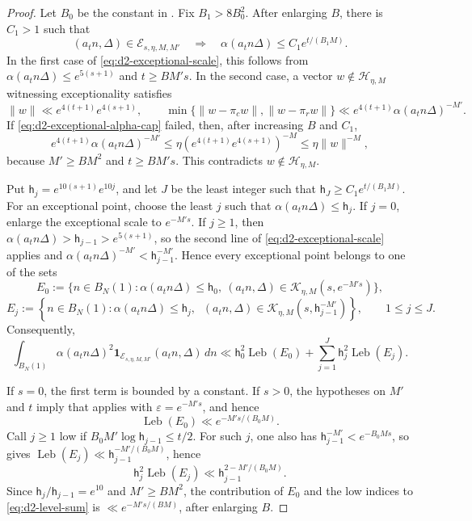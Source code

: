 \documentclass[reqno,11pt]{amsart}
\theoremstyle{definition}
\theoremstyle{remark}
\numberwithin{equation}{section}
\newcommand{\Leb}{\operatorname{Leb}}
\begin{document}
\begin{proof}
Let $B_0$ be the constant in . Fix $B_1>8B_0^2$. After enlarging $B$, there is $C_1>1$ such that
\begin{equation}\label{eq:d2-exceptional-alpha-cap}
(a_tn,\Delta)\in\mathcal E_{s,\eta,M,M'}\quad\Rightarrow\quad 
\alpha(a_tn\Delta)\le C_1e^{t/(B_1M)}.
\end{equation}
In the first case of \eqref{eq:d2-exceptional-scale}, this follows from $\alpha(a_tn\Delta)\le e^{5(s+1)}$ and $t\ge BM's$. In the second case, a vector $w\notin\mathcal H_{\eta,M}$ witnessing exceptionality satisfies
$$
\|w\|\ll e^{4(t+1)} e^{4(s+1)},
\qquad
\min\{\|w-\pi_cw\|,\|w-\pi_rw\|\}\ll e^{4(t+1)}\alpha(a_tn\Delta)^{-M'}.
$$
If \eqref{eq:d2-exceptional-alpha-cap} failed, then, after increasing $B$ and $C_1$,
$$
 e^{4(t+1)} \alpha(a_tn\Delta)^{-M'}\le\eta(e^{4(t+1)} e^{4(s+1)})^{-M}\le\eta\|w\|^{-M},
$$
because $M'\ge BM^2$ and $t\ge BM's$. This contradicts $w\notin\mathcal H_{\eta,M}$.

Put $\mathsf h_j=e^{10(s+1)}e^{10j}$, and let $J$ be the least integer such that $\mathsf h_J\ge C_1e^{t/(B_1M)}$. For an exceptional point, choose the least $j$ such that $\alpha(a_tn\Delta)\le\mathsf h_j$. If $j=0$, enlarge the exceptional scale to $e^{-M's}$. If $j\ge1$, then $\alpha(a_tn\Delta)>\mathsf h_{j-1}>e^{5(s+1)}$, so the second line of \eqref{eq:d2-exceptional-scale} applies and $\alpha(a_tn\Delta)^{-M'}<\mathsf h_{j-1}^{-M'}$. Hence every exceptional point belongs to one of the sets
$$
E_0:=\{n\in B_N(1):\alpha(a_tn\Delta)\le\mathsf h_0,\ (a_tn,\Delta)\in\mathcal K_{\eta,M}(s,e^{-M's})\},
$$
$$
E_j:=\left\{n\in B_N(1):
\alpha(a_tn\Delta)\le\mathsf h_j ,\;\;
(a_tn,\Delta)\in\mathcal K_{\eta,M}(s,\mathsf h_{j-1}^{-M'}) \right\},
\qquad1\le j\le J.
$$
Consequently,
\begin{equation}\label{eq:d2-level-sum}
\int_{B_N(1)}\alpha(a_tn\Delta)^2\mathbf1_{\mathcal E_{s,\eta,M,M'}}(a_tn,\Delta)\,dn
\ll\mathsf h_0^2\Leb(E_0)+\sum_{j=1}^J\mathsf h_j^2\Leb(E_j).
\end{equation}

If $s=0$, the first term is bounded by a constant. If $s>0$, the hypotheses on $M'$ and $t$ imply that  applies with $\varepsilon=e^{-M's}$, and hence
$$
\Leb(E_0)\ll e^{-M's/(B_0M)}.
$$
Call $j\ge1$ low if $B_0M'\log\mathsf h_{j-1}\le t/2$. For such $j$, one also has $\mathsf h_{j-1}^{-M'}<e^{-B_0Ms}$, so  gives $\Leb(E_j)\ll\mathsf h_{j-1}^{-M'/(B_0M)}$, hence
$$
\mathsf h_j^2\Leb(E_j)\ll\mathsf h_{j-1}^{2-M'/(B_0M)}.
$$
Since $\mathsf h_j/\mathsf h_{j-1}=e^{10}$ and $M'\ge BM^2$, the contribution of $E_0$ and the low indices to \eqref{eq:d2-level-sum} is $\ll e^{-M's/(BM)}$, after enlarging $B$.


\end{proof}
\end{document}
